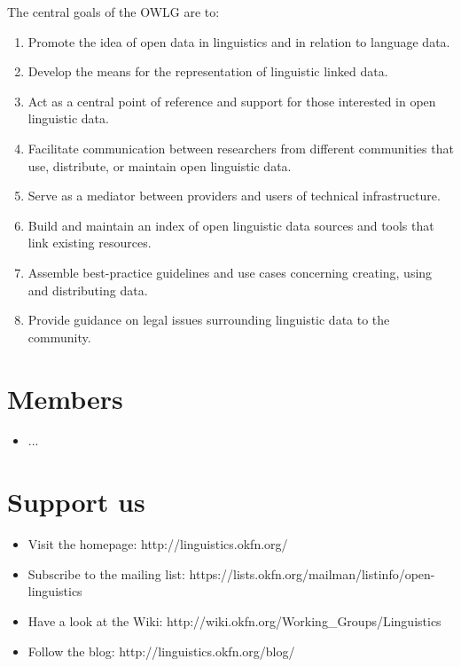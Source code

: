 \documentclass[
notumble,
nofoldmark,
]{leaflet}
\begin{document}
The central goals of the OWLG are to:
\begin{enumerate}

\item Promote the idea of open data in linguistics and in relation to language data.
\item Develop the means for the representation of linguistic linked data.
\item Act as a central point of reference and support for those interested in open linguistic data.
\item Facilitate communication between researchers from different communities that use, distribute, or maintain open linguistic data.
\item Serve as a mediator between providers and users of technical infrastructure.
\item Build and maintain an index of open linguistic data sources and tools that link existing resources.
\item Assemble best-practice guidelines and use cases concerning creating, using and distributing data.
\item Provide guidance on legal issues surrounding linguistic data to the community.

\end{enumerate}
 
\newpage  %
\section{Members}

\begin{itemize}
 \item ...
\end{itemize}

     
\newpage   %
\section{Support us}
 
 \begin{itemize}
 \item Visit the homepage: http://linguistics.okfn.org/
 \item Subscribe to the mailing list: https://lists.okfn.org/mailman/listinfo/open-linguistics
 \item Have a look at the Wiki: http://wiki.okfn.org/Working_Groups/Linguistics
 \item Follow the blog: http://linguistics.okfn.org/blog/
\end{itemize}

\loggingall
\end{document}
